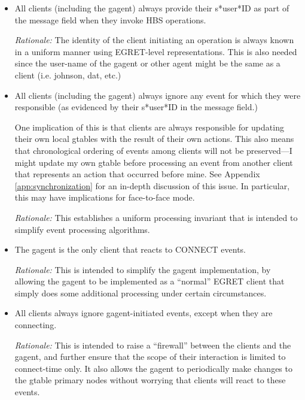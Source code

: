 \begin{itemize}
  
\item All clients (including the gagent) always provide their s*user*ID as
  part of the message field when they invoke HBS operations.  
  
  {\em Rationale: } The identity of the client initiating an operation is
  always known in a uniform manner using EGRET-level representations. This
  is also needed since the user-name of the gagent or other agent might be
  the same as a client (i.e. johnson, dat, etc.)
  
\item All clients (including the gagent) always ignore any event for which
  they were responsible (as evidenced by their s*user*ID in the message
  field.) 
  
  One implication of this is that clients are always responsible for
  updating their own local gtables with the result of their own actions.
  This also means that chronological ordering of events among clients
  will not be preserved---I might update my own gtable before processing
  an event from another client that represents an action that occurred
  before mine. See Appendix \ref{app:synchronization} for an in-depth
  discussion of this issue. In particular, this may have implications for
  face-to-face mode.

  {\em Rationale: } This establishes a uniform processing invariant that is
  intended to simplify event processing algorithms. 

\item The gagent is the only client that reacts to CONNECT events.
  
  {\em Rationale: } This is intended to simplify the gagent implementation,
  by allowing the gagent to be implemented as a ``normal'' EGRET client that
  simply does some additional processing under certain circumstances.
    
\item All clients always ignore gagent-initiated events, except when they
  are connecting.
  
  {\em Rationale: } This is intended to raise a ``firewall'' between the
  clients and the gagent, and further ensure that the scope of their
  interaction is limited to connect-time only.  It also allows the gagent
  to periodically make changes to the gtable primary nodes without worrying
  that clients will react to these events.

\end{itemize}


